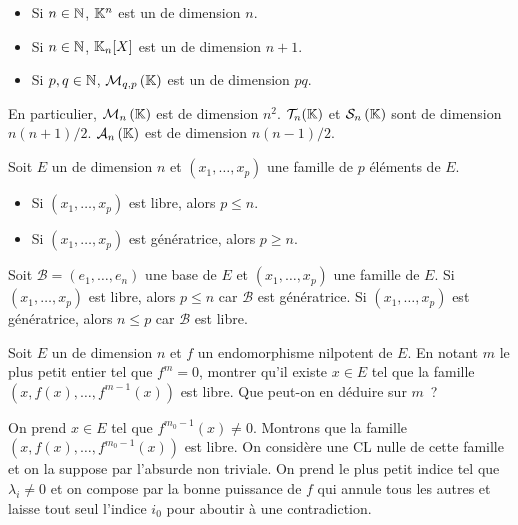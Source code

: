 \documentclass{magnolia}
\begin{document}
\begin{proposition}[utile=-3]
\begin{itemize}
\item Si $n\in\mathbb{N}$, $\mathbb{K}^n$ est un \Kev de dimension $n$.
\item Si $n\in\mathbb{N}$, $\polyK[n]$ est un \Kev de dimension $n+1$.
\item Si $p,q\in\mathbb{N}$, $\mathcal{M}_{q,p}\left(\mathbb{K}\right)$ est un \Kev de dimension $pq$. 
\end{itemize}
\end{proposition}

\begin{remarques}
\remarque En particulier, $\mathcal{M}_{n}\left(\mathbb{K}\right)$ est de dimension $n^2$.
\remarque $\mathcal{T}_n(\mathbb{K})$ et $\mathcal{S}_n\left(\mathbb{K}\right)$ sont de dimension $n(n+1)/2$. $\mathcal{A}_n\left(\mathbb{K}\right)$ est de dimension $n(n-1)/2$.
\end{remarques}

\begin{proposition}[utile=-3]
Soit $E$ un \Kev de dimension $n$ et $(x_1,\ldots,x_p)$ une famille de $p$
éléments de $E$.
\begin{itemize}
\item Si $(x_1,\ldots,x_p)$ est libre, alors $p\leq n$.
\item Si $(x_1,\ldots,x_p)$ est génératrice, alors $p\geq n$.
\end{itemize}
\end{proposition}
\begin{preuve}
Soit $\mathcal{B}=(e_1,\ldots,e_n)$ une base de $E$ et $(x_1,\ldots,x_p)$ une
famille de $E$. Si $(x_1,\ldots,x_p)$ est libre, alors $p\leq n$ car
$\mathcal{B}$ est génératrice. Si $(x_1,\ldots,x_p)$ est génératrice, alors
$n\leq p$ car $\mathcal{B}$ est libre.
\end{preuve}

\begin{exoUnique}
\exo Soit $E$ un \Kev de dimension $n$ et $f$ un endomorphisme nilpotent
  de $E$. En notant $m$ le plus petit entier tel que $f^{m}=0$, montrer
  qu'il existe $x\in E$ tel que la famille $(x,f(x),\ldots,f^{m-1}(x))$ est
  libre. Que peut-on en déduire sur $m$~?
  
  \begin{sol}
  On prend $x\in E$ tel que $f^{m_0-1}(x)\neq 0$. Montrons que la famille $(x,f(x),\ldots,f^{m_0-1}(x))$ est libre. On considère une CL nulle de cette famille et on la suppose par l'absurde non triviale. On prend le plus petit indice tel que $\lambda_i\neq 0$ et on compose par la bonne puissance de $f$ qui annule tous les autres et laisse tout seul l'indice $i_0$ pour aboutir à une contradiction.
  \end{sol}
\end{exoUnique}
\end{document}
